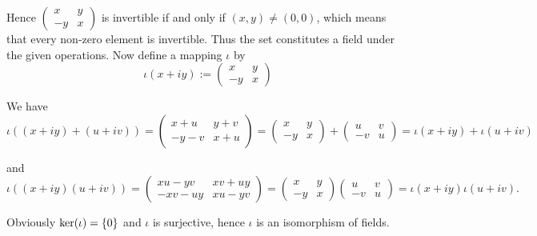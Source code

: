 \begin{enumerate}[label = \textbf{Exercise \arabic*.},wide = 0pt, itemsep=1.5ex]
\begin{enumerate}[label = \alph*),wide = 0pt, itemsep=1.5ex]
Hence $\begin{pmatrix}
		x & y\\
		-y & x
	\end{pmatrix}$ is invertible if and only if $(x,y) \neq (0,0)$, which means that every non-zero element is invertible. Thus the set constitutes a field under the given operations. Now define a mapping $\iota$ by
	\begin{equation}
	\iota(x + iy) := \begin{pmatrix}
		x & y\\
		-y & x
	\end{pmatrix}
	\label{eq:iso}
	\end{equation}

	We have 
	\begin{equation*}
		\iota((x + iy) + (u + iv)) = \begin{pmatrix}
			x + u & y + v\\
			-y-v & x + u
		\end{pmatrix} = \begin{pmatrix}
		x & y\\
		-y & x
	\end{pmatrix} + \begin{pmatrix}
		u & v\\
		-v & u
	\end{pmatrix} = \iota(x + iy) + \iota(u + iv)
	\end{equation*}

	\noindent and 
	\begin{equation*}
		\iota((x + iy)(u +iv)) = \begin{pmatrix}
		xu - yv & xv + uy\\
		-xv-uy & xu-yv
	\end{pmatrix} = \begin{pmatrix}
		x & y\\
		-y & x
	\end{pmatrix}\begin{pmatrix}
		u & v\\
		-v & u
	\end{pmatrix}
	= \iota(x + iy)\iota(u +iv).
	\end{equation*}

	Obviously $\ker(\iota) = \cbr[0]{0}$ and $\iota$ is surjective, hence $\iota$ is an isomorphism of fields.


\end{enumerate}
\end{enumerate}
